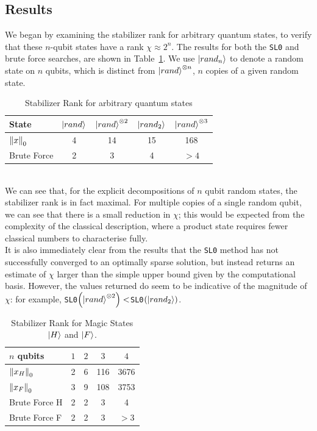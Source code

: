 \documentclass{standalone}
\begin{document}
\subsection{Results}
We began by examining the stabilizer rank for arbitrary quantum states, to verify that these $n$-qubit states have a rank $\chi\approx 2^{n}$. The results for both the \texttt{SL0} and brute force searches, are shown in Table~\ref{tab:arbitrary}. We use $\ket{rand_{n}}$ to denote a random state on $n$ qubits, which is distinct from $\ket{rand}^{\otimes n}$, $n$ copies of a given random state.
\begin{table}[!h]
\caption{Stabilizer Rank for arbitrary quantum states}\label{tab:arbitrary}
\centering
\begin{tabular}{||l|c|c|c|c||}
\hline
State & $\ket{rand}$ & $\ket{rand}^{\otimes 2}$ & $\ket{rand_{2}}$ &$\ket{rand}^{\otimes 3}$ \\ \hline
$\norm{x}_{0}$ & 4 & 14 & 15 & 168\\ \hline
Brute Force & 2 & 3  & 4 & $>4$\\ \hline
\end{tabular}
\end{table}\\
We can see that, for the explicit decompositions of $n$ qubit random states, the stabilizer rank is in fact maximal. For multiple copies of a single random qubit, we can see that there is a small reduction in $\chi$; this would be expected from the complexity of the classical description, where a product state requires fewer classical numbers to characterise fully.\\
It is also immediately clear from the results that the \texttt{SL0} method has not successfully converged to an optimally sparse solution, but instead returns an estimate of $\chi$ larger than the simple upper bound given by the computational basis. However, the values returned do seem to be indicative of the magnitude of $\chi$: for example, \texttt{SL0}$\left(\ket{rand}^{\otimes 2}\right)<$\texttt{SL0}$\left(\ket{rand_{2}}\right)$.
\par
\begin{table}[!h]
\centering
\caption{Stabilizer Rank for Magic States $\ket{H}$ and $\ket{F}$.}\label{tab:magic}
\begin{tabular}{||l|c|c|c|c||}
\hline
$n$ qubits & $1$ & $2$ & $3$ & $4$ \\ \hline
$\norm{x_{H}}_{0}$ & 2 & 6 & 116 & 3676\\ \hline
$\norm{x_{F}}_{0}$ & 3 & 9 & 108 & 3753\\ \hline
Brute Force H & 2 & 2  & 3 & 4\\ \hline
Brute Force F & 2 & 2  & 3 & $>3$ \\ \hline
\end{tabular}
\end{table}
\end{document}
